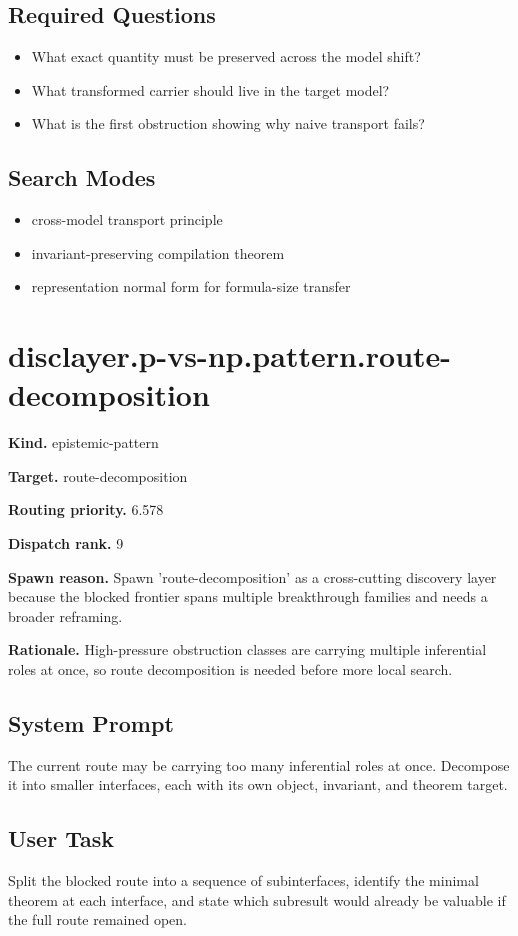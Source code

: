 \documentclass[11pt]{article}
\begin{document}
\subsection*{Required Questions}
\begin{itemize}[leftmargin=*,itemsep=0.2em]
\item What exact quantity must be preserved across the model shift?
\item What transformed carrier should live in the target model?
\item What is the first obstruction showing why naive transport fails?
\end{itemize}
\subsection*{Search Modes}
\begin{itemize}[leftmargin=*,itemsep=0.2em]
\item cross-model transport principle
\item invariant-preserving compilation theorem
\item representation normal form for formula-size transfer
\end{itemize}
\section{disclayer.p-vs-np.pattern.route-decomposition}
\textbf{Kind.} epistemic-pattern

\textbf{Target.} route-decomposition

\textbf{Routing priority.} 6.578

\textbf{Dispatch rank.} 9

\textbf{Spawn reason.} Spawn 'route-decomposition' as a cross-cutting discovery layer because the blocked frontier spans multiple breakthrough families and needs a broader reframing.

\textbf{Rationale.} High-pressure obstruction classes are carrying multiple inferential roles at once, so route decomposition is needed before more local search.

\subsection*{System Prompt}
The current route may be carrying too many inferential roles at once. Decompose it into smaller interfaces, each with its own object, invariant, and theorem target.

\subsection*{User Task}
Split the blocked route into a sequence of subinterfaces, identify the minimal theorem at each interface, and state which subresult would already be valuable if the full route remained open.
\end{document}
